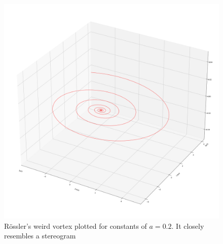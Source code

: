 \documentclass[conference]{IEEEtran}
\begin{document}
\begin{figure}
\centerline{\includegraphics[width = \linewidth]{2.png}}
\caption{Rössler's weird vortex plotted for constants of $a=0.2$. It closely resembles a stereogram}
\end{figure}
\end{document}
